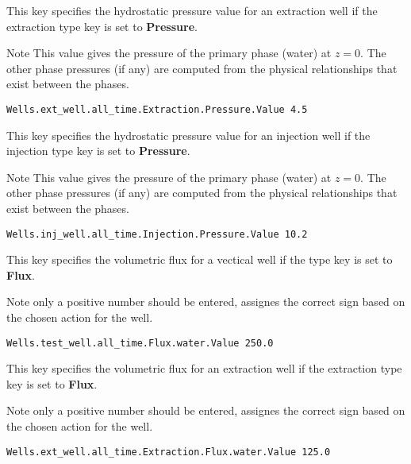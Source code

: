 {
This key specifies the hydrostatic pressure value for an extraction well
if the extraction type key is set to {\bf Pressure}.

Note This value gives the pressure of the primary phase (water) at
$z=0$.  The other phase pressures (if any) are computed from the physical
relationships that exist between the phases.
}
\begin{display}\begin{verbatim}
Wells.ext_well.all_time.Extraction.Pressure.Value 4.5
\end{verbatim}\end{display}

{
This key specifies the hydrostatic pressure value for an injection well
if the injection type key is set to {\bf Pressure}.

Note This value gives the pressure of the primary phase (water) at
$z=0$.  The other phase pressures (if any) are computed from the physical
relationships that exist between the phases.
}
\begin{display}\begin{verbatim}
Wells.inj_well.all_time.Injection.Pressure.Value 10.2
\end{verbatim}\end{display}

{
This key specifies the volumetric flux for a vectical well if the type
key is set to {\bf Flux}.

Note only a positive number should be entered, \parflow{} assignes the
correct sign based on the chosen action for the well.
}
\begin{display}\begin{verbatim}
Wells.test_well.all_time.Flux.water.Value 250.0
\end{verbatim}\end{display}

{
This key specifies the volumetric flux for an extraction well if the
extraction type key is set to {\bf Flux}.

Note only a positive number should be entered, \parflow{} assignes the
correct sign based on the chosen action for the well.
}
\begin{display}\begin{verbatim}
Wells.ext_well.all_time.Extraction.Flux.water.Value 125.0
\end{verbatim}\end{display}

